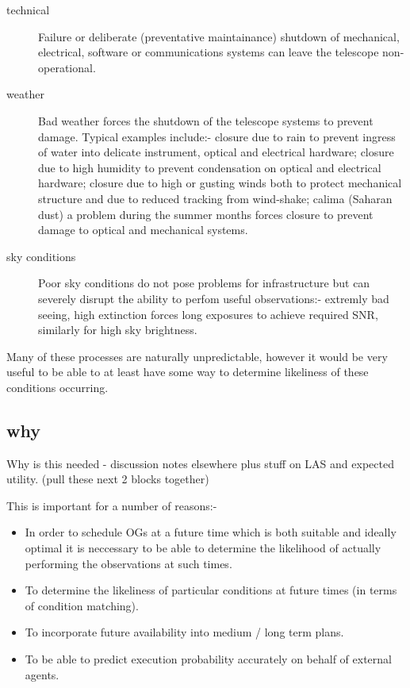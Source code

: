 \begin{description}
\item [technical] Failure or deliberate (preventative maintainance) shutdown of mechanical, electrical, software or communications systems can leave the telescope non-operational.
\item [weather] Bad weather forces the shutdown of the telescope systems to prevent damage. Typical examples include:- closure due to rain to prevent ingress of water into delicate instrument, optical and electrical hardware; closure due to high humidity to prevent condensation on optical and electrical hardware; closure due to high or gusting winds both to protect mechanical structure and due to reduced tracking from wind-shake; calima (Saharan dust) a problem during the summer months forces closure to prevent damage to optical and mechanical systems.
\item [sky conditions] Poor sky conditions do not pose problems for infrastructure but can severely disrupt the ability to perfom useful observations:- extremly bad seeing, high extinction forces long exposures to achieve required SNR, similarly for high sky brightness.
\end{description}
  
Many of these processes are naturally unpredictable, however it would be very useful to be able to at least have some way to determine likeliness of these conditions occurring.


\subsection{why}
Why is this needed - discussion notes elsewhere plus stuff on LAS and expected utility. (pull these next 2 blocks together)

This is important for a number of reasons:-
\begin{itemize}
\item In order to schedule OGs at a future time which is both suitable and ideally optimal it is neccessary to be able to determine the likelihood of actually performing the observations at such times.
\item To determine the likeliness of particular conditions at future times (in terms of condition matching).
\item To incorporate future availability into medium / long term plans.
\item To be able to predict execution probability accurately on behalf of external agents.
\end{itemize}

